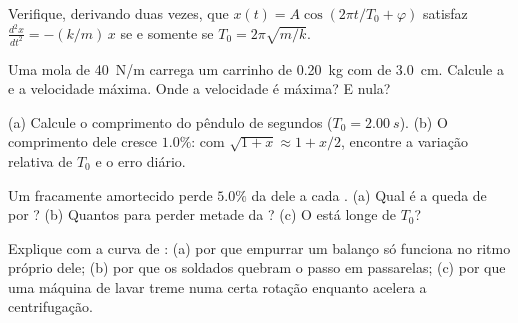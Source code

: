 \begin{exercise}[$\star\star$]\label{exo:g12:oscillators-and-time:7}
Verifique, derivando duas vezes, que $x(t) = A\cos(2\pi t/T_0 + \varphi)$ satisfaz
$\frac{d^2x}{dt^2} = -(k/m)\,x$ se e somente se $T_0 = 2\pi\sqrt{m/k}$.
\end{exercise}

\begin{exercise}[$\star\star$]\label{exo:g12:oscillators-and-time:8}
Uma mola de  \qty{40}{N/m} carrega um carrinho de \qty{0.20}{kg} com
 de \qty{3.0}{cm}. Calcule a  e a velocidade máxima. Onde a
velocidade é máxima? E nula?
\end{exercise}

\begin{exercise}[$\star\star$]\label{exo:g12:oscillators-and-time:9}
(a) Calcule o comprimento do pêndulo de segundos ($T_0 = \qty{2.00}{s}$). (b) O
comprimento dele cresce $1.0\%$: com $\sqrt{1+x} \approx 1 + x/2$, encontre a variação
relativa de $T_0$ e o erro diário.
\end{exercise}

\begin{exercise}[$\star\star$]\label{exo:g12:oscillators-and-time:10}
Um  fracamente amortecido perde $5.0\%$ da  dele a cada . (a)
Qual é a queda de  por ? (b) Quantos  para perder metade da
? (c) O  está longe de $T_0$?
\end{exercise}

\begin{exercise}[$\star\star$]\label{exo:g12:oscillators-and-time:11}
Explique com a curva de : (a) por que empurrar um balanço só funciona no
ritmo próprio dele; (b) por que os soldados quebram o passo em passarelas; (c) por que
uma máquina de lavar treme numa certa rotação enquanto acelera a centrifugação.
\end{exercise}

